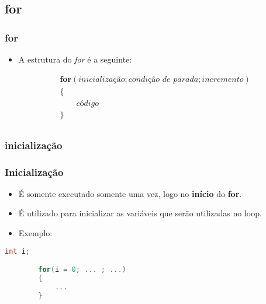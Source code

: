 \subsection{for}

\begin{frame}
\frametitle{for}

    \begin{itemize}
        \item A estrutura do \textit{for} é a seguinte:
    \end{itemize}

    \begin{equation*}
        \begin{aligned}
            & \bm{for} ( \textit{inicialização} ; \textit{condição de parada} ; \textit{incremento} ) \\
            & \{ \\
            & \qquad \textit{código} \\
            & \} \\
        \end{aligned}
      \end{equation*}

\end{frame}



\subsubsection{inicialização}

\begin{frame}[fragile]
\frametitle{Inicialização}

    \begin{itemize}
        
        \item É somente executado somente uma vez, logo no \textbf{início} do \textbf{for}.

        \item É utilizado para inicializar as variáveis que serão utilizadas no loop.

        \item Exemplo:

    \end{itemize}

    \begin{lstlisting}[language=C]
        int i;

        for(i = 0; ... ; ...)
        {
            ...
        }
    \end{lstlisting}

\end{frame}





